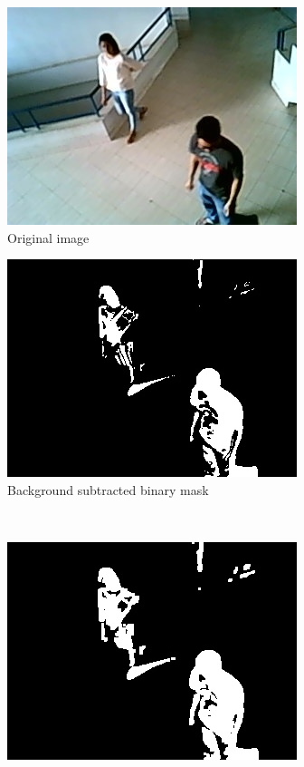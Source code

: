 \documentclass[12pt,a4paper]{report}
\begin{document}
\begin{figure}
\begin{subfigure}{.5\textwidth}
  \centering
  \includegraphics[width=.8\linewidth]{morphology/original.jpeg}
  \caption{Original image}
  \label{fig:sfig1}
\end{subfigure}%
\begin{subfigure}{.5\textwidth}
  \centering
  \includegraphics[width=.8\linewidth]{morphology/bgsub.jpeg}
  \caption{Background subtracted binary mask}
  \label{fig:sfig2}
\end{subfigure}\\
\begin{subfigure}{.5\textwidth}
  \centering
  \includegraphics[width=.8\linewidth]{morphology/dilate1.jpeg}

\end{subfigure}
\end{figure}
\end{document}
